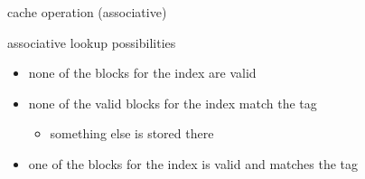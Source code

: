 \begin{frame}{cache operation (associative)}
\end{frame}

\begin{frame}{associative lookup possibilities}
    \begin{itemize}
    \item none of the blocks for the index are valid
    \item none of the valid blocks for the index match the tag
        \begin{itemize}
        \item something else is stored there
        \end{itemize}
    \item one of the blocks for the index is valid and matches the tag
    \end{itemize}
\end{frame}
